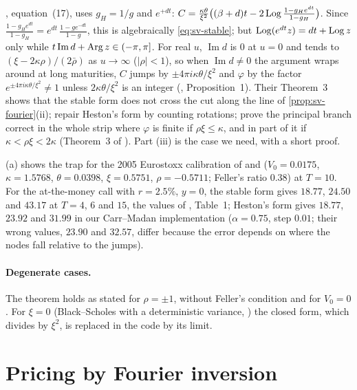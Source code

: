 \begin{remark}\label{rem:sv-trap}
\textcite{heston}, equation~(17), uses $g_H=1/g$ and $e^{+dt}$:
$C=\frac{\kappa\theta}{\xi^2}\big((\beta+d)t-2\operatorname{Log}\frac{1-g_He^{dt}}{1-g_H}\big)$. Since
$\frac{1-g_He^{dt}}{1-g_H}=e^{dt}\,\frac{1-ge^{-dt}}{1-g}$, this is algebraically \eqref{eq:sv-stable}; but
$\operatorname{Log}(e^{dt}z)=dt+\operatorname{Log} z$ only while $t\operatorname{Im}d+\operatorname{Arg} z\in(-\pi,\pi]$. For real $u$, $\operatorname{Im}d$ is $0$ at
$u=0$ and tends to $(\xi-2\kappa\rho)/(2\bar\rho)$ as $u\to\infty$ ($|\rho|<1$), so when $\operatorname{Im}d\ne0$ the argument
wraps around at long maturities, $C$ jumps by $\pm4\pi i\kappa\theta/\xi^2$ and $\varphi$ by the factor $e^{\pm4\pi i\kappa\theta/\xi^2}\ne1$ unless
$2\kappa\theta/\xi^2$ is an integer (\textcite{albrecher-trap}, Proposition~1). Their Theorem~3 shows that the
stable form does not cross the cut along the line of \cref{prop:sv-fourier}(ii); \textcite{kahl-jaeckel}
repair Heston's form by counting rotations; \textcite{lord-kahl} prove the principal branch correct in the
whole strip where $\varphi$ is finite if $\rho\xi\le\kappa$, and in part of it if $\kappa<\rho\xi<2\kappa$
(Theorem~3 of \textcite{lord-kahl-wp}). Part (iii) is the case we need, with a short proof.
\end{remark}

(a) shows the trap for the 2005 Eurostoxx calibration of \textcite{fang-oosterlee} and
\textcite{albrecher-trap} ($V_0=0.0175$, $\kappa=1.5768$, $\theta=0.0398$, $\xi=0.5751$, $\rho=-0.5711$; Feller's
ratio $0.38$) at $T=10$. For the at-the-money call with $r=2.5\%$, $y=0$, the stable form gives $18.77$, $24.50$
and $43.17$ at $T=4$, $6$ and $15$, the values of \textcite{albrecher-trap}, Table~1; Heston's form gives
$18.77$, $23.92$ and $31.99$ in our Carr--Madan implementation ($\alpha=0.75$, step $0.01$; their wrong values, $23.90$ and $32.57$, differ
because the error depends on where the nodes fall relative to the jumps).

\paragraph{Degenerate cases.} The theorem holds as stated for $\rho=\pm1$, without Feller's condition and for
$V_0=0$. For $\xi=0$ (Black--Scholes with a deterministic variance, ) the closed form,
which divides by $\xi^2$, is replaced in the code by its limit.

\section{Pricing by Fourier inversion}\label{sec:sv-fourier}

